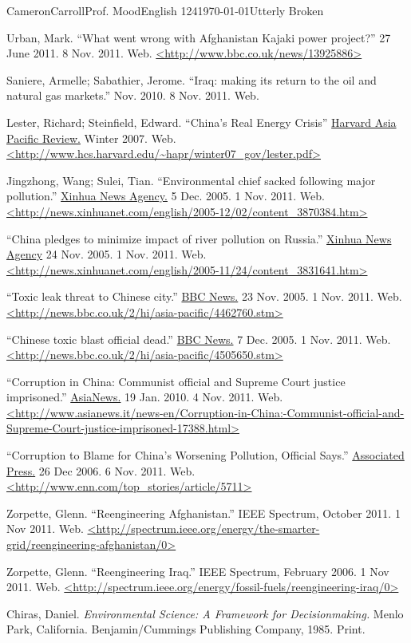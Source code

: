 \begin{mla}{Cameron}{Carroll}{Prof. Mood}{English 124}{\today}{Utterly Broken}
\begin{workscited}
\bibent
Urban, Mark. ``What went wrong with Afghanistan Kajaki power project?'' 27 June 2011. 8 Nov. 2011. Web. \url{<http://www.bbc.co.uk/news/13925886>}

\bibent
Saniere, Armelle; Sabathier, Jerome. ``Iraq: making its return to the oil and natural gas markets.'' Nov. 2010. 8 Nov. 2011. Web. 

\bibent
Lester, Richard; Steinfield, Edward. ``China's Real Energy Crisis'' \underline{Harvard Asia Pacific Review.} Winter 2007. Web. \url{<http://www.hcs.harvard.edu/~hapr/winter07_gov/lester.pdf>}

\bibent
Jingzhong, Wang; Sulei, Tian. ``Environmental chief sacked following major pollution.'' \underline{Xinhua News Agency.} 5 Dec. 2005. 1 Nov. 2011. Web. \url{<http://news.xinhuanet.com/english/2005-12/02/content_3870384.htm>} 

\bibent
``China pledges to minimize impact of river pollution on Russia.'' \underline{Xinhua News Agency} 24 Nov. 2005. 1 Nov. 2011. Web.
\url{<http://news.xinhuanet.com/english/2005-11/24/content_3831641.htm>}

\bibent
``Toxic leak threat to Chinese city.'' \underline{BBC News.} 23 Nov. 2005. 1 Nov. 2011. Web. \url{<http://news.bbc.co.uk/2/hi/asia-pacific/4462760.stm>}

\bibent
``Chinese toxic blast official dead.'' \underline{BBC News.} 7 Dec. 2005. 1 Nov. 2011. Web.
\url{<http://news.bbc.co.uk/2/hi/asia-pacific/4505650.stm>}

\bibent
``Corruption in China: Communist official and Supreme Court justice imprisoned.'' \underline{AsiaNews.} 19 Jan. 2010. 4 Nov. 2011. Web. \url{<http://www.asianews.it/news-en/Corruption-in-China:-Communist-official-and-Supreme-Court-justice-imprisoned-17388.html>}

\bibent
``Corruption to Blame for China's Worsening Pollution, Official Says.'' \underline{Associated Press.} 26 Dec 2006. 6 Nov. 2011. Web. \url{<http://www.enn.com/top_stories/article/5711>}

\bibent
Zorpette, Glenn. ``Reengineering Afghanistan.'' IEEE Spectrum, October 2011. 1 Nov 2011. Web. \url{<http://spectrum.ieee.org/energy/the-smarter-grid/reengineering-afghanistan/0>}

\bibent
Zorpette, Glenn.  ``Reengineering Iraq.'' IEEE Spectrum, February 2006. 1 Nov 2011. Web. \url{<http://spectrum.ieee.org/energy/fossil-fuels/reengineering-iraq/0>}	

\bibent
Chiras, Daniel. \emph{Environmental Science: A Framework for Decisionmaking.} Menlo Park, California. Benjamin/Cummings Publishing Company, 1985. Print.


\end{workscited}
\end{mla}
